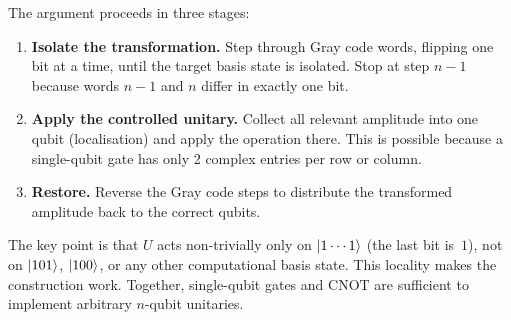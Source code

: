 \documentclass[12pt, a4paper, oneside]{report}
\theoremstyle{plain}
\theoremstyle{definition}
\theoremstyle{remark}
\newcommand{\CNOT}{\mathrm{CNOT}}
\begin{document}
The argument proceeds in three stages:
\begin{enumerate}
	\item \textbf{Isolate the transformation.} Step through Gray code words, flipping one bit
	      at a time, until the target basis state is isolated. Stop at step $n-1$ because words
	      $n-1$ and $n$ differ in exactly one bit.
	\item \textbf{Apply the controlled unitary.} Collect all relevant amplitude into one qubit
	      (localisation) and apply the operation there. This is possible because a single-qubit
	      gate has only 2 complex entries per row or column.
	\item \textbf{Restore.} Reverse the Gray code steps to distribute the transformed
	      amplitude back to the correct qubits.
\end{enumerate}

The key point is that $U$ acts non-trivially only on $\ket{1\cdots1}$ (the last bit is~$1$),
not on $\ket{101}$, $\ket{100}$, or any other computational basis state. This locality makes
the construction work. Together, single-qubit gates and $\CNOT$ are sufficient to implement
arbitrary $n$-qubit unitaries.
\end{document}
